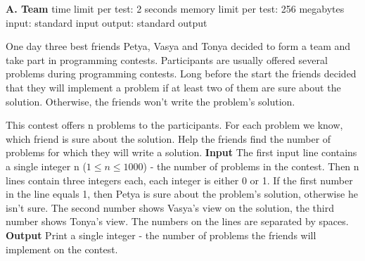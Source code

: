 \documentclass[11pt]{article}
\begin{document}
    \begin{center}
        \textbf{A. Team}
        \newline
        time limit per test: 2 seconds
        \newline
        memory limit per test: 256 megabytes
        \newline
        input: standard input
        \newline
        output: standard output
        \newline
    \end{center}
    One day three best friends Petya, Vasya and Tonya decided to form a team and take part in programming contests.
    Participants are usually offered several problems during programming contests.
    Long before the start the friends decided that they will implement a problem if at least two of them are sure about the solution.
    Otherwise, the friends won't write the problem's solution.

    This contest offers n problems to the participants.
    For each problem we know, which friend is sure about the solution.
    Help the friends find the number of problems for which they will write a solution.
    \newline
    \newline
    \textbf{Input}
    \newline
    The first input line contains a single integer n ($1 \leq n \leq 1000$) - the number of problems in the contest.
    Then n lines contain three integers each, each integer is either 0 or 1.
    If the first number in the line equals 1, then Petya is sure about the problem's solution, otherwise he isn't sure.
    The second number shows Vasya's view on the solution, the third number shows Tonya's view.
    The numbers on the lines are separated by spaces.
    \newline
    \newline
    \textbf{Output}
    \newline
    Print a single integer - the number of problems the friends will implement on the contest.
\end{document}
